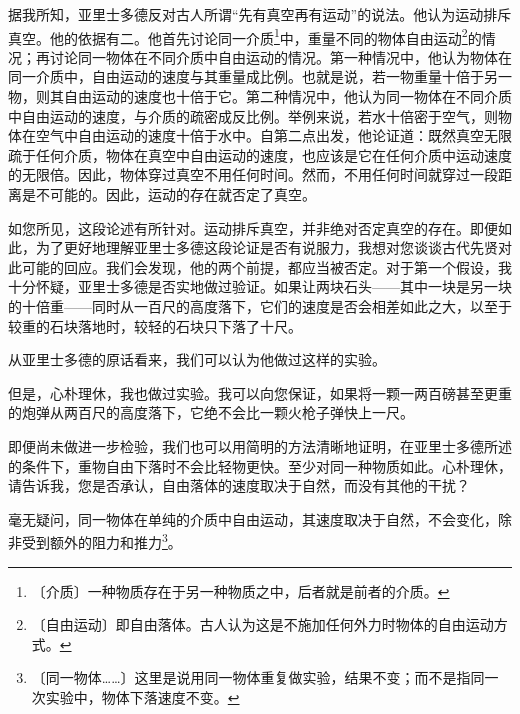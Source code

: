 \documentclass[12pt,UTF-8,openany]{ctexbook}
\begin{document}
\begin{normalsize}
    
    \begin{description}[itemsep=1ex,leftmargin=4.5em,labelwidth=4em]
    
    \item[{\color{script-2-0} 心朴理休}]据我所知，亚里士多德反对古人所谓“先有真空再有运动”的说法。他认为运动排斥真空。他的依据有二。他首先讨论同一介质\footnote{〔介质〕一种物质存在于另一种物质之中，后者就是前者的介质。}中，重量不同的物体自由运动\footnote{〔自由运动〕即自由落体。古人认为这是不施加任何外力时物体的自由运动方式。}的情况；再讨论同一物体在不同介质中自由运动的情况。第一种情况中，他认为物体在同一介质中，自由运动的速度与其重量成比例。也就是说，若一物重量十倍于另一物，则其自由运动的速度也十倍于它。第二种情况中，他认为同一物体在不同介质中自由运动的速度，与介质的疏密成反比例。举例来说，若水十倍密于空气，则物体在空气中自由运动的速度十倍于水中。自第二点出发，他论证道：既然真空无限疏于任何介质，物体在真空中自由运动的速度，也应该是它在任何介质中运动速度的无限倍。因此，物体穿过真空不用任何时间。然而，不用任何时间就穿过一段距离是不可能的。因此，运动的存在就否定了真空。
    
    \item[{\color{script-2-1} 萨为亚第}]如您所见，这段论述有所针对。运动排斥真空，并非绝对否定真空的存在。即便如此，为了更好地理解亚里士多德这段论证是否有说服力，我想对您谈谈古代先贤对此可能的回应。我们会发现，他的两个前提，都应当被否定。对于第一个假设，我十分怀疑，亚里士多德是否实地做过验证。如果让两块石头——其中一块是另一块的十倍重——同时从一百尺的高度落下，它们的速度是否会相差如此之大，以至于较重的石块落地时，较轻的石块只下落了十尺。
    
    \item[{\color{script-2-0} 心朴理休}]从亚里士多德的原话看来，我们可以认为他做过这样的实验。
    
    \item[{\color{script-2-2} 撒格列托}]但是，心朴理休，我也做过实验。我可以向您保证，如果将一颗一两百磅甚至更重的炮弹从两百尺的高度落下，它绝不会比一颗火枪子弹快上一尺。
    
    \item[{\color{script-2-1} 萨为亚第}]即便尚未做进一步检验，我们也可以用简明的方法清晰地证明，在亚里士多德所述的条件下，重物自由下落时不会比轻物更快。至少对同一种物质如此。心朴理休，请告诉我，您是否承认，自由落体的速度取决于自然，而没有其他的干扰？
    
    \item[{\color{script-2-0} 心朴理休}]毫无疑问，同一物体在单纯的介质中自由运动，其速度取决于自然，不会变化，除非受到额外的阻力和推力\footnote{〔同一物体……〕这里是说用同一物体重复做实验，结果不变；而不是指同一次实验中，物体下落速度不变。}。
    

\end{description}
\end{normalsize}
\end{document}
